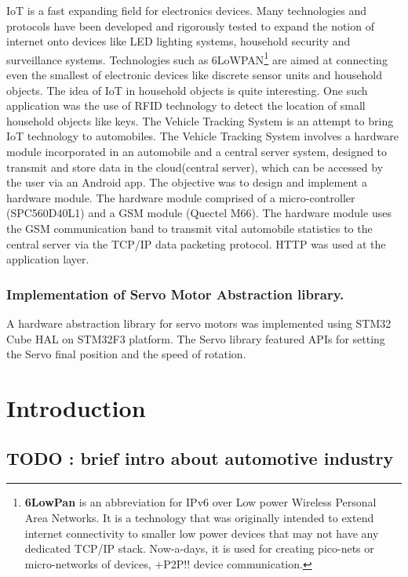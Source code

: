 \documentclass[]{book}
\begin{document}
IoT is a fast expanding field for electronics devices. Many technologies
and protocols have been developed and rigorously tested to expand the
notion of internet onto devices like LED lighting systems, household
security and surveillance systems. Technologies such as
6LoWPAN\footnote{\textbf{6LowPan} is an abbreviation for IPv6 over Low
  power Wireless Personal Area Networks. It is a technology that was
  originally intended to extend internet connectivity to smaller low
  power devices that may not have any dedicated TCP/IP stack.
  Now-a-days, it is used for creating pico-nets or micro-networks of
  devices, +P2P!! device communication.} are aimed at connecting even
the smallest of electronic devices like discrete sensor units and
household objects. The idea of IoT in household objects is quite
interesting. One such application was the use of RFID technology to
detect the location of small household objects like keys. The Vehicle
Tracking System is an attempt to bring IoT technology to automobiles.
The Vehicle Tracking System involves a hardware module incorporated in
an automobile and a central server system, designed to transmit and
store data in the cloud(central server), which can be accessed by the
user via an Android app. The objective was to design and implement a
hardware module. The hardware module comprised of a micro-controller
(SPC560D40L1) and a GSM module (Quectel M66). The hardware module uses
the GSM communication band to transmit vital automobile statistics to
the central server via the TCP/IP data packeting protocol. HTTP was used
at the application layer.

\subsection{Implementation of Servo Motor Abstraction
library.}\label{implementation-of-servo-motor-abstraction-library.}

A hardware abstraction library for servo motors was implemented using
STM32 Cube HAL on STM32F3 platform. The Servo library featured APIs for
setting the Servo final position and the speed of rotation.

\chapter{Introduction}\label{introduction}

\section{TODO : brief intro about automotive
industry}\label{todo-brief-intro-about-automotive-industry}
\end{document}
